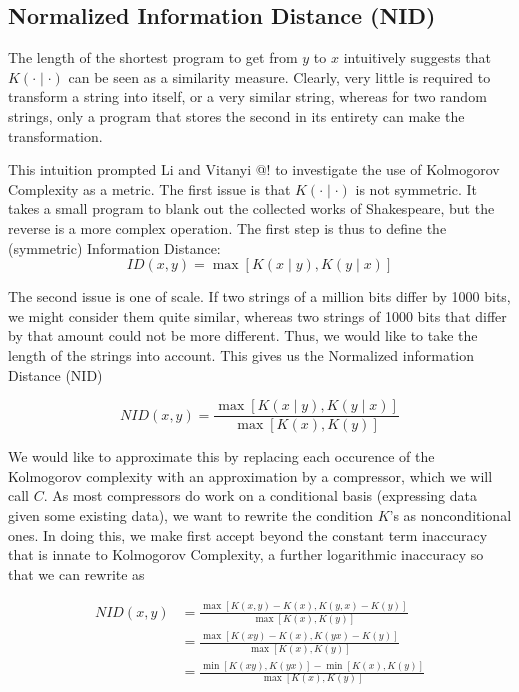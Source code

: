 \documentclass[10pt,a4paper,oneside]{article}
\begin{document}
\subsection*{Normalized Information Distance (NID)}

The length of the shortest program to get from $y$ to $x$ intuitively suggests that $K(\cdot\mid \cdot)$ can be seen as a similarity measure. Clearly, very little is required to transform a string into itself, or a very similar string, whereas for two random strings, only a program that stores the second in its entirety can make the transformation.

This intuition prompted Li and Vitanyi @! \cite{} to investigate the use of Kolmogorov Complexity as a metric. The first issue is that $K(\cdot\mid \cdot)$ is not symmetric. It takes a small program to blank out the collected works of Shakespeare, but the reverse is a more complex operation. The first step is thus to define the (symmetric) Information Distance:
\[
ID(x, y) = \max \left [K(x\mid y),K(y\mid x) \right ] 
\]  

The second issue is one of scale. If two strings of a million bits differ by 1000 bits, we might consider them quite similar, whereas two strings of 1000 bits that differ by that amount could not be more different. Thus, we would like to take the length of the strings into account. This gives us the Normalized information Distance (NID)

\[
NID(x, y) = \frac{\max \left [K(x \mid y),K(y \mid x) \right ] }{\max \left [K(x), K(y) \right ]}
\] 

We would like to approximate this by replacing each occurence of the Kolmogorov complexity with an approximation by a compressor, which we will call $C$. As most compressors do work on a conditional basis (expressing data given some existing data), we want to rewrite the condition $K$'s as nonconditional ones. In doing this, we make first accept beyond the constant term inaccuracy that is innate to Kolmogorov Complexity, a further logarithmic inaccuracy so that we can rewrite as

\begin{align*}
NID(x, y)	 &= \frac{\max \left [K(x, y) - K(x),K(y, x) - K(y)\right ] }{\max \left [K(x), K(y) \right ]} \\ 
	&= \frac{\max \left [K(xy) - K(x),K(yx) - K(y)\right ] } {\max \left [K(x), K(y) \right ]} \\
	&= \frac{\min \left [K(xy), K(yx)\right ] - \min \left[K(x), K(y)\right]}{\max \left [K(x), K(y) \right ]} 
\end{align*}
\end{document}
